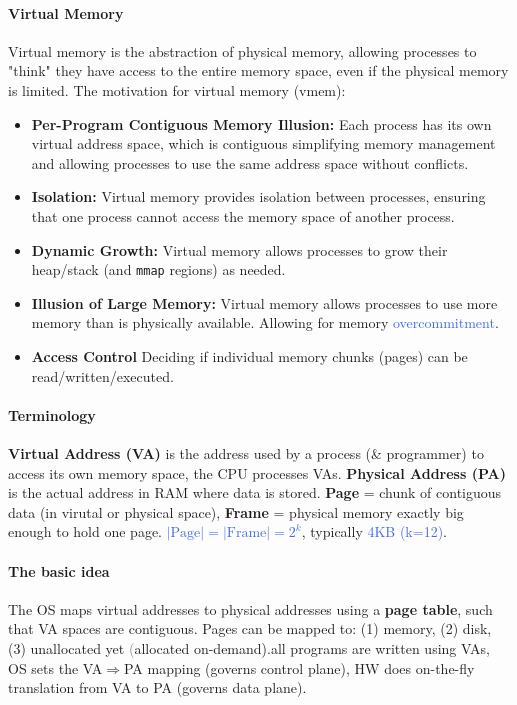 \documentclass[openany,12pt]{book}
\newcommand{\code}[1]{\texttt{#1}}
\newcommand{\blue}[1]{\textcolor{RoyalBlue}{#1}}
\newcommand{\gray}[1]{\textcolor{gray}{#1}}
\begin{document}
\paragraph{Virtual Memory} Virtual memory is the abstraction of physical memory, allowing processes to "think" they have access to the entire memory space, even if the physical memory is limited. The motivation for virtual memory (vmem): 
\begin{itemize}
  \item \textbf{Per-Program Contiguous Memory Illusion:} Each process has its own virtual address space, which is contiguous simplifying memory management and allowing processes to use the same address space without conflicts.
  
  \item \textbf{Isolation:} Virtual memory provides isolation between processes, ensuring that one process cannot access the memory space of another process. 
  
  \item \textbf{Dynamic Growth:} Virtual memory allows processes to grow their heap/stack (and \code{mmap} regions) as needed.
  
  \item \textbf{Illusion of Large Memory:} Virtual memory allows processes to use more memory than is physically available. Allowing for memory \blue{overcommitment}. 
  
  \item \textbf{Access Control} Deciding if individual memory chunks (pages) can be read/written/executed.
\end{itemize}


\paragraph{Terminology} \textbf{Virtual Address (VA)} is the address used by a process (\& programmer) to access its own memory space, the CPU processes VAs. \textbf{Physical Address (PA)} is the actual address in RAM where data is stored. \textbf{Page} = chunk of contiguous data (in virutal or physical space), \textbf{Frame} = physical memory exactly big enough to hold one page. \blue{\(|\text{Page}|=|\text{Frame}|=2^k\)}, typically \blue{4KB (k=12)}.


\paragraph{The basic idea} The OS maps virtual addresses to physical addresses using a \textbf{page table}, such that VA spaces are contiguous. Pages can be mapped to: (1) memory, (2) disk, (3) unallocated yet \gray(allocated on-demand).all programs are written using VAs, OS sets the VA\(\Longrightarrow\)PA mapping (governs control plane), HW does on-the-fly translation from VA to PA (governs data plane). 
\end{document}
